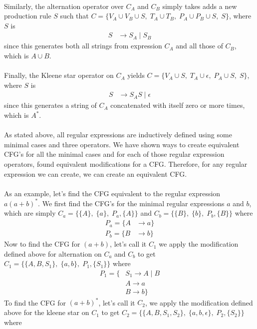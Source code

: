 \documentclass[12pt]{article}
\begin{document}
\begin{itemize}
\\
Similarly, the alternation operator over $C_A$ and $C_B$ simply takes adds a new production rule $S$ such that $C =\{V_A \cup V_B \cup S,\; T_A \cup T_B,\; P_A \cup P_B \cup S,\; S\}$, where $S$ is
\begin{align}
\nonumber S &\rightarrow S_A\;|\;S_B
\end{align}
since this generates both all strings from expression $C_A$ and all those of $C_B$, which is $A \cup B$. \\
\\
Finally, the Kleene star operator on $C_A$ yields $C = \{V_A \cup S,\; T_A \cup \epsilon,\; P_A \cup S,\; S\}$, where $S$ is
\begin{align}
\nonumber S &\rightarrow S_AS\;|\;\epsilon
\end{align}
since this generates a string of $C_A$ concatenated with itself zero or more times, which is $A^*$. \\
\\
As stated above, all regular expressions are inductively defined using some minimal cases and three operators. We have shown ways to create equivalent CFG's for all the minimal cases and for each of those regular expression operators, found equivalent modifications for a CFG. Therefore, for any regular expression we can create, we can create an equivalent CFG. \\
\\
As an example, let's find the CFG equivalent to the regular expression $a(a+b)^*$. We first find the CFG's for the minimal regular expressions $a$ and $b$, which are simply $C_a=\{\{A\},\; \{a\},\; P_a, \{A\}\}$ and $C_b=\{\{B\},\; \{b\},\; P_b, \{B\}\}$ where 
\begin{align}
\nonumber P_a = \{A &\rightarrow a\} \\
\nonumber P_b = \{B &\rightarrow b\}
\end{align}
Now to find the CFG for $(a+b)$, let's call it $C_1$ we apply the modification defined above for alternation on $C_a$ and $C_b$ to get $C_1=\{\{A,B, S_1\},\; \{a,b\},\; P_1, \{S_1\}\}$ where 
\begin{align}
\nonumber P_1 = \{&S_1 \rightarrow A\;|\;B \\
\nonumber &A \rightarrow a \\
\nonumber &B \rightarrow b\}
\end{align}
To find the CFG for $(a+b)^*$, let's call it $C_2$, we apply the modification defined above for the kleene star on $C_1$ to get $C_2=\{\{A,B, S_1, S_2\},\; \{a,b,\epsilon\},\; P_2, \{S_2\}\}$ where 

\end{itemize}
\end{document}
